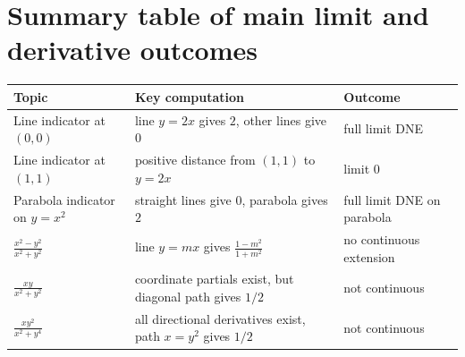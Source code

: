 \documentclass[11pt]{article}
\begin{document}
\section*{Summary table of main limit and derivative outcomes}

\begin{center}
\renewcommand{\arraystretch}{1.25}
\begin{tabular}{@{}p{}p{}p{}@{}}
\toprule
Topic & Key computation & Outcome\\
\midrule
Line indicator at \((0,0)\) & line \(y=2x\) gives \(2\), other lines give \(0\) & full limit DNE\\
Line indicator at \((1,1)\) & positive distance from \((1,1)\) to \(y=2x\) & limit \(0\)\\
Parabola indicator on \(y=x^2\) & straight lines give \(0\), parabola gives \(2\) & full limit DNE on parabola\\
\(\frac{x^2-y^2}{x^2+y^2}\) & line \(y=mx\) gives \(\frac{1-m^2}{1+m^2}\) & no continuous extension\\
\(\frac{xy}{x^2+y^2}\) & coordinate partials exist, but diagonal path gives \(1/2\) & not continuous\\
\(\frac{xy^2}{x^2+y^4}\) & all directional derivatives exist, path \(x=y^2\) gives \(1/2\) & not continuous\\
\bottomrule
\end{tabular}
\end{center}
\end{document}
